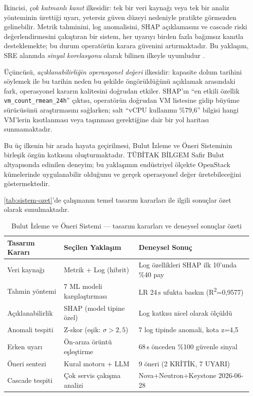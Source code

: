 İkincisi, \textit{çok katmanlı kanıt} ilkesidir: tek bir veri kaynağı veya tek bir analiz yönteminin ürettiği uyarı, yetersiz güven düzeyi nedeniyle pratikte görmezden gelinebilir.
Metrik tahminini, log anomalisini, SHAP açıklamasını ve cascade riski değerlendirmesini çakıştıran bir sistem, her uyarıyı birden fazla bağımsız kanıtla desteklemekte; bu durum operatörün karara güvenini artırmaktadır.
Bu yaklaşım, SRE alanında \textit{sinyal korelasyonu} olarak bilinen ilkeyle uyumludur \autocite{beyer2016}.

Üçüncüsü, \textit{açıklanabilirliğin operasyonel değeri} ilkesidir: kapasite dolum tarihini söylemek ile bu tarihin neden bu şekilde öngörüldüğünü açıklamak arasındaki fark, operasyonel kararın kalitesini doğrudan etkiler.
SHAP'ın ``en etkili özellik \texttt{vm\_count\_rmean\_24h}'' çıktısı, operatörün doğrudan VM listesine gidip büyüme sürücüsünü araştırmasını sağlarken; salt ``vCPU kullanımı \%79{,}6'' bilgisi hangi VM'lerin kısıtlanması veya taşınması gerektiğine dair bir yol haritası sunmamaktadır.

Bu üç ilkenin bir arada hayata geçirilmesi, Bulut İzleme ve Öneri Sisteminin birleşik özgün katkısını oluşturmaktadır.
TÜBİTAK BİLGEM Safir Bulut altyapısında edinilen deneyim; bu yaklaşımın endüstriyel ölçekte OpenStack kümelerinde uygulanabilir olduğunu ve gerçek operasyonel değer üretebileceğini göstermektedir.

\autoref{tab:sistem-ozet}'de çalışmanın temel tasarım kararları ile ilgili sonuçlar özet olarak sunulmaktadır.

\begin{table}[htbp]
    \centering
    \caption{Bulut İzleme ve Öneri Sistemi — tasarım kararları ve deneysel sonuçlar özeti}
    \label{tab:sistem-ozet}
    \begin{tabular}{p{4.2cm}p{4.2cm}p{4.8cm}}
        \textbf{Tasarım Kararı} & \textbf{Seçilen Yaklaşım} & \textbf{Deneysel Sonuç} \\
        \hline
        Veri kaynağı           & Metrik + Log (hibrit)        & Log özellikleri SHAP ilk 10'unda \%40 pay \\
        Tahmin yöntemi         & 7 ML modeli karşılaştırması  & LR 24\,s ufukta baskın (R\textsuperscript{2}=0{,}9577) \\
        Açıklanabilirlik       & SHAP (model tipine özel)     & Log katkısı nicel olarak ölçüldü \\
        Anomali tespiti        & Z-skor (eşik: $\sigma>2{,}5$) & 7 log tipinde anomali, kota z=4{,}5 \\
        Erken uyarı            & Ön-arıza örüntü eşleştirme  & 68\,s önceden \%100 güvenle sinyal \\
        Öneri sentezi          & Kural motoru + LLM           & 9 öneri (2 KRİTİK, 7 UYARI) \\
        Cascade tespiti        & Çok servis çakışma analizi   & Nova+Neutron+Keystone 2026-06-28 \\
    \end{tabular}
\end{table}

